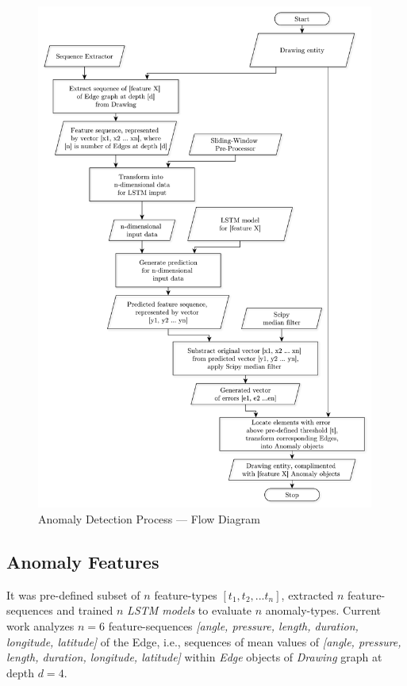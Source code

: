\begin{figure}[htb]
  \centering
    \includegraphics[width=0.99\textwidth]
        {images/anomaly/flow-anomaly-detection}
    \caption{Anomaly Detection Process --- Flow Diagram}
    \label{flow-anomaly-detection}
\end{figure}

\subsection{Anomaly Features}

It was pre-defined subset of $n$ feature-types $[t_1, t_2, ...t_n]$, extracted $n$ feature-sequences and trained $n$ \textit{LSTM models} to evaluate $n$ anomaly-types. Current work analyzes $n = 6$ feature-sequences \textit{[angle, pressure, length, duration, longitude, latitude]} of the Edge, i.e., sequences of mean values of \textit{[angle, pressure, length, duration, longitude, latitude]} within \textit{Edge} objects of \textit{Drawing} graph at depth $d = 4$.

